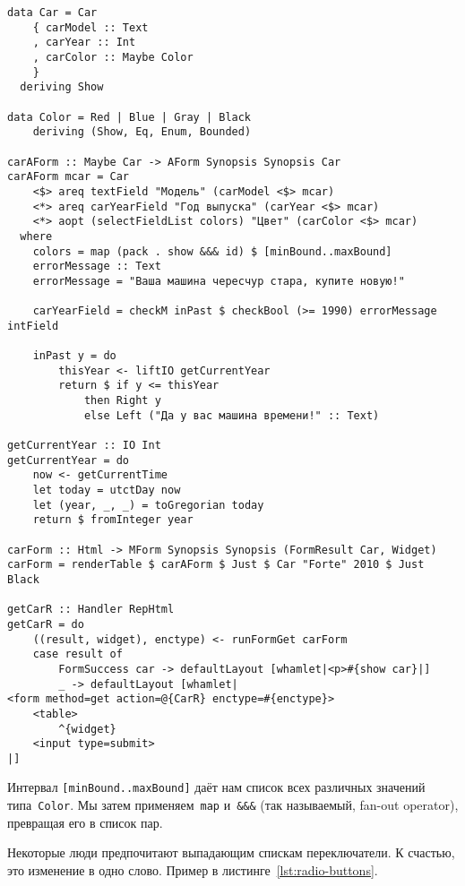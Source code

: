 \begin{lstlisting}[caption={Используя Enum и Bounded}]
data Car = Car
    { carModel :: Text
    , carYear :: Int
    , carColor :: Maybe Color
    }
  deriving Show

data Color = Red | Blue | Gray | Black
    deriving (Show, Eq, Enum, Bounded)

carAForm :: Maybe Car -> AForm Synopsis Synopsis Car
carAForm mcar = Car
    <$> areq textField "Модель" (carModel <$> mcar)
    <*> areq carYearField "Год выпуска" (carYear <$> mcar)
    <*> aopt (selectFieldList colors) "Цвет" (carColor <$> mcar)
  where
    colors = map (pack . show &&& id) $ [minBound..maxBound]
    errorMessage :: Text
    errorMessage = "Ваша машина чересчур стара, купите новую!"

    carYearField = checkM inPast $ checkBool (>= 1990) errorMessage intField

    inPast y = do
        thisYear <- liftIO getCurrentYear
        return $ if y <= thisYear
            then Right y
            else Left ("Да у вас машина времени!" :: Text)

getCurrentYear :: IO Int
getCurrentYear = do
    now <- getCurrentTime
    let today = utctDay now
    let (year, _, _) = toGregorian today
    return $ fromInteger year

carForm :: Html -> MForm Synopsis Synopsis (FormResult Car, Widget)
carForm = renderTable $ carAForm $ Just $ Car "Forte" 2010 $ Just Black

getCarR :: Handler RepHtml
getCarR = do
    ((result, widget), enctype) <- runFormGet carForm
    case result of
        FormSuccess car -> defaultLayout [whamlet|<p>#{show car}|]
        _ -> defaultLayout [whamlet|
<form method=get action=@{CarR} enctype=#{enctype}>
    <table>
        ^{widget}
    <input type=submit>
|]
\end{lstlisting}

Интервал \lstinline'[minBound..maxBound]' даёт нам список всех различных
значений типа~\lstinline'Color'. Мы затем применяем~\lstinline'map'
и~\lstinline'&&&' (так называемый, fan-out operator), превращая его в список пар.

Некоторые люди предпочитают выпадающим спискам переключатели.  К счастью, это
изменение в одно слово. Пример в листинге~\ref{lst:radio-buttons}.

